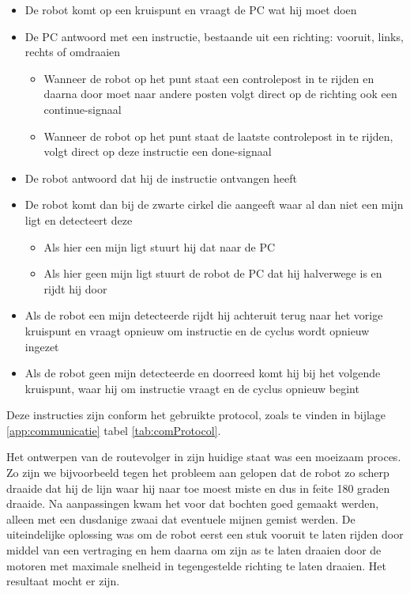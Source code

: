 \documentclass{report}
\begin{document}
\begin{itemize}
	\item De robot komt op een kruispunt en vraagt de PC wat hij moet doen
	\item De PC antwoord met een instructie, bestaande uit een richting: vooruit, links, rechts of omdraaien
		\begin{itemize}
			\item Wanneer de robot op het punt staat een controlepost in te rijden en daarna door moet naar andere posten volgt direct op de richting ook een continue-signaal
			\item Wanneer de robot op het punt staat de laatste controlepost in te rijden, volgt direct op deze instructie een done-signaal
		\end{itemize}
	\item De robot antwoord dat hij de instructie ontvangen heeft
	\item De robot komt dan bij de zwarte cirkel die aangeeft waar al dan niet een mijn ligt en detecteert deze
		\begin{itemize}
			\item Als hier een mijn ligt stuurt hij dat naar de PC
			\item Als hier geen mijn ligt stuurt de robot de PC dat hij halverwege is en rijdt hij door
		\end{itemize}
	\item Als de robot een mijn detecteerde rijdt hij achteruit terug naar het vorige kruispunt en vraagt opnieuw om instructie en de cyclus wordt opnieuw ingezet
	\item Als de robot geen mijn detecteerde en doorreed komt hij bij het volgende kruispunt, waar hij om instructie vraagt en de cyclus opnieuw begint
\end{itemize}

Deze instructies zijn conform het gebruikte protocol, zoals te vinden in bijlage \ref{app:communicatie} tabel \ref{tab:comProtocol}.

Het ontwerpen van de routevolger in zijn huidige staat was een moeizaam proces. Zo zijn we bijvoorbeeld tegen het probleem aan gelopen dat de robot zo scherp draaide dat hij de lijn waar hij naar toe moest miste en dus in feite 180 graden draaide. Na aanpassingen kwam het voor dat bochten goed gemaakt werden, alleen met een dusdanige zwaai dat eventuele mijnen gemist werden. De uiteindelijke oplossing was om de robot eerst een stuk vooruit te laten rijden door middel van een vertraging en hem daarna om zijn as te laten draaien door de motoren met maximale snelheid in tegengestelde richting te laten draaien. Het resultaat mocht er zijn.
\end{document}

